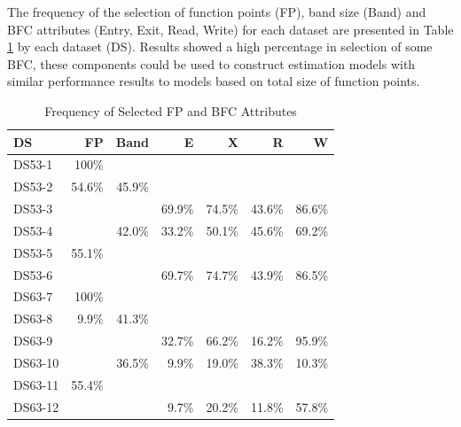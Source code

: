 \documentclass[conference]{IEEEtran}
\begin{document}
The frequency of the selection of function points (FP), band size (Band) and BFC attributes (Entry, Exit, Read, Write) for each dataset are presented in Table \ref{TableAttributes} by each dataset (DS). Results showed a high percentage in selection of some BFC, these components could be used to construct estimation models with similar performance results to models based on total size of function points.

\begin{table}
\centering
\caption{Frequency of Selected FP and BFC Attributes}
\label{TableAttributes}
\begin{tabular}{|l|r|r|r|r|r|r|}\hline
\textbf{DS}&\textbf{FP} & \textbf{Band} & \textbf{E} & \textbf{X} & \textbf{R} & \textbf{W}\\\hline
DS53-1  & 100\%  &         &         &         &         &         \\
DS53-2  & 54.6\%   & 45.9\% &         &         &         &         \\
DS53-3  &          &         & 69.9\%  & 74.5\%  & 43.6\%  & 86.6\%  \\
DS53-4  &          & 42.0\% & 33.2\% & 50.1\% & 45.6\% & 69.2\% \\
DS53-5  & 55.1\%  &         &         &         &         &         \\
DS53-6  &          &         & 69.7\% & 74.7\% & 43.9\% & 86.5\% \\\hline
DS63-7  & 100\%  &         &         &         &         &         \\
DS63-8  & 9.9\%   & 41.3\% &         &         &         &         \\
DS63-9  &          &         & 32.7\%  & 66.2\%  & 16.2\%  & 95.9\%  \\
DS63-10 &          & 36.5\% & 9.9\%  & 19.0\% & 38.3\% & 10.3\% \\
DS63-11 & 55.4\%  &         &         &         &         &         \\
DS63-12 &          &         & 9.7\%  & 20.2\% & 11.8\% & 57.8\%\\\hline 
\end{tabular}
\end{table}
\end{document}
